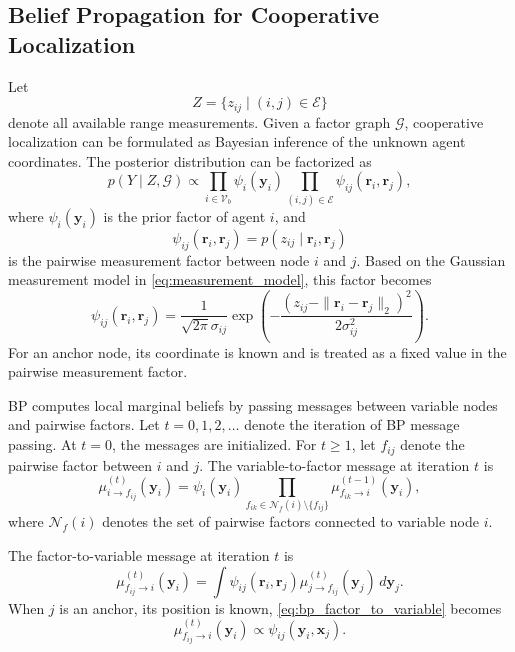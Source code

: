 \subsection{Belief Propagation for Cooperative Localization}
\label{sec:bp_algorithm}
Let
\[
    Z=
    \{z_{ij}\mid(i,j)\in\mathcal{E}\}
\]
denote all available range measurements. Given a factor graph $\mathcal{G}$, cooperative localization can be formulated as Bayesian inference of the unknown agent coordinates. The posterior distribution can be factorized as
\begin{equation}
    p(Y\mid Z,\mathcal{G})
    \propto
    \prod_{i\in\mathcal{V}_b}
    \psi_i(\mathbf{y}_i)
    \prod_{(i,j)\in\mathcal{E}}
    \psi_{ij}(\mathbf{r}_i,\mathbf{r}_j),
    \label{eq:posterior_factorization}
\end{equation}
where $\psi_i(\mathbf{y}_i)$ is the prior factor of agent $i$, and
\[
    \psi_{ij}(\mathbf{r}_i,\mathbf{r}_j)
    =
    p(z_{ij}\mid\mathbf{r}_i,\mathbf{r}_j)
\]
is the pairwise measurement factor between node $i$ and $j$. Based on the Gaussian measurement model in \eqref{eq:measurement_model}, this factor becomes
\begin{equation}
    \psi_{ij}(\mathbf{r}_i,\mathbf{r}_j)
    =
    \frac{1}{\sqrt{2\pi}\sigma_{ij}}
    \exp\left(
    -
    \frac{
    \left(
    z_{ij}-\|\mathbf{r}_i-\mathbf{r}_j\|_2
    \right)^2
    }{2\sigma_{ij}^2}
    \right).
    \label{eq:measurement_factor}
\end{equation}
For an anchor node, its coordinate is known and is treated as a fixed value in the pairwise measurement factor.

BP computes local marginal beliefs by passing messages between variable nodes and pairwise factors. Let $t=0,1,2,\ldots$ denote the iteration of BP message passing. At $t=0$, the messages are initialized. For $t\ge1$, let $f_{ij}$ denote the pairwise factor between $i$ and $j$. The variable-to-factor message at iteration $t$ is
\begin{equation}
    \mu_{i\rightarrow f_{ij}}^{(t)}(\mathbf{y}_i)
    =
    \psi_i(\mathbf{y}_i)
    \prod_{f_{ik}\in\mathcal{N}_f(i)\setminus \{f_{ij}\}}
    \mu_{f_{ik}\rightarrow i}^{(t-1)}(\mathbf{y}_i),
    \label{eq:bp_variable_to_factor}
\end{equation}
where $\mathcal{N}_f(i)$ denotes the set of pairwise factors connected to variable node $i$.

The factor-to-variable message at iteration $t$ is
\begin{equation}
    \mu_{f_{ij}\rightarrow i}^{(t)}(\mathbf{y}_i)
    =
    \int
    \psi_{ij}(\mathbf{r}_i,\mathbf{r}_j)
    \mu_{j\rightarrow f_{ij}}^{(t)}(\mathbf{y}_j)
    \,d\mathbf{y}_j.
    \label{eq:bp_factor_to_variable}
\end{equation}
When $j$ is an anchor, its position is known, \eqref{eq:bp_factor_to_variable} becomes
\begin{equation}
    \mu_{f_{ij}\rightarrow i}^{(t)}(\mathbf{y}_i)
    \propto
    \psi_{ij}(\mathbf{y}_i,\mathbf{x}_j).
    \label{eq:bp_anchor_message}
\end{equation}


